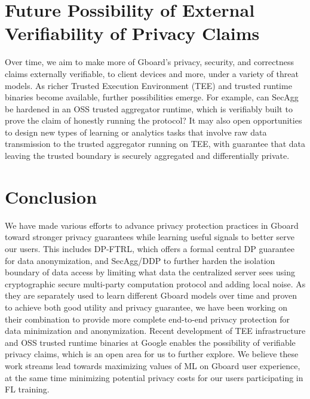\documentclass{article}
\begin{document}
\section{Future Possibility of External Verifiability of Privacy Claims}


Over time, we aim to make more of Gboard’s privacy, security, and correctness claims externally verifiable, to client devices and more, under a variety of threat models. As richer Trusted Execution Environment (TEE) and trusted runtime binaries \cite{prjoak, fcpfedagg} become available, further possibilities emerge. For example, can SecAgg be hardened in an OSS trusted aggregator runtime, which is verifiably built to prove the claim of honestly running the protocol? It may also open opportunities to design new types of learning or analytics tasks that involve raw data transmission to the trusted aggregator running on TEE, with guarantee that data leaving the trusted boundary is securely aggregated and differentially private.



\section{Conclusion}

We have made various efforts to advance privacy protection practices in Gboard toward stronger privacy guarantees while learning useful signals to better serve our users. This includes DP-FTRL, which offers a formal central DP guarantee for data anonymization, and SecAgg/DDP to further harden the isolation boundary of data access by limiting what data the centralized server sees using cryptographic secure multi-party computation protocol and adding local noise. As they are separately used to learn different Gboard models over time and proven to achieve both good utility and privacy guarantee, we have been working on their combination to provide more complete end-to-end privacy protection for data minimization and anonymization. Recent development of TEE infrastructure and OSS trusted runtime binaries at Google enables the possibility of verifiable privacy claims, which is an open area for us to further explore. We believe these work streams lead towards maximizing values of ML on Gboard user experience, at the same time minimizing potential privacy costs for our users participating in FL training.




\printbibliography
%
%
\end{document}
